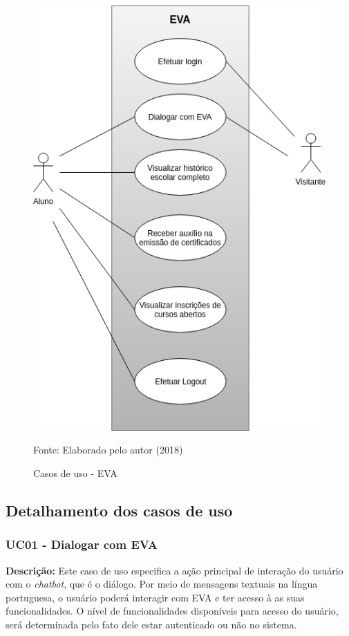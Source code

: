 \begin{figure}[htb!]
    \centering
    \includegraphics[width=0.3\linewidth]{src/imagens/CasoDeUsoEva.png}
    \caption{Casos de uso - EVA} Fonte: Elaborado pelo autor (2018)
    \label{cap:03:fig:diagrama}
\end{figure}

\subsection{Detalhamento dos casos de uso}\label{cap3-detalhamento-casos-de-uso}

\subsubsection{UC01 - Dialogar com EVA}
\textbf{Descrição:} Este caso de uso especifica a ação principal de interação do usuário com o \textit{chatbot}, que é o diálogo. Por meio de mensagens textuais na língua portuguesa, o usuário poderá interagir com EVA e ter acesso à as suas funcionalidades. O nível de funcionalidades disponíveis para acesso do usuário, será determinada pelo fato dele estar autenticado ou não no sistema.

